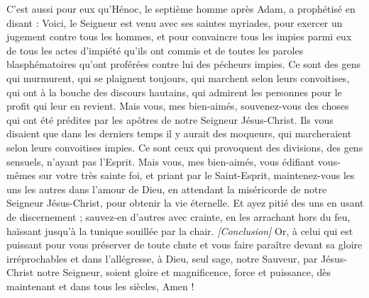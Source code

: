 \begin{multicols}{2}
C’est aussi pour eux qu’Hénoc, le septième homme après Adam, a prophétisé en disant :
Voici, le Seigneur est venu avec ses saintes myriades, pour exercer un jugement contre tous les hommes, et pour convaincre tous les impies parmi eux de tous les actes d'impiété qu’ils ont commis et de toutes les paroles blasphématoires qu’ont proférées contre lui des pécheurs impies.
Ce sont des gens qui murmurent, qui se plaignent toujours, qui marchent selon leurs convoitises, qui ont à la bouche des discours hautains, qui admirent les personnes pour le profit qui leur en revient.
Mais vous, mes bien-aimés, souvenez-vous des choses qui ont été prédites par les apôtres de notre Seigneur Jésus-Christ.
Ils vous disaient que dans les derniers temps il y aurait des moqueurs, qui marcheraient selon leurs convoitises impies.
Ce sont ceux qui provoquent des divisions, des gens sensuels, n'ayant pas l'Esprit.
Mais vous, mes bien-aimés, vous édifiant vous-mêmes sur votre très sainte foi, et priant par le Saint-Esprit,
maintenez-vous les uns les autres dans l'amour de Dieu, en attendant la miséricorde de notre Seigneur Jésus-Christ, pour obtenir la vie éternelle.
Et ayez pitié des uns en usant de discernement ;
sauvez-en d’autres avec crainte, en les arrachant hors du feu, haïssant jusqu’à la tunique souillée par la chair.
\textit{[Conclusion]}
Or, à celui qui est puissant pour vous préserver de toute chute et vous faire paraître devant sa gloire irréprochables et dans l’allégresse,
à Dieu, seul sage, notre Sauveur, par Jésus-Christ notre Seigneur, soient gloire et magnificence, force et puissance, dès maintenant et dans tous les siècles, Amen !
\PPE{}
\end{multicols}
